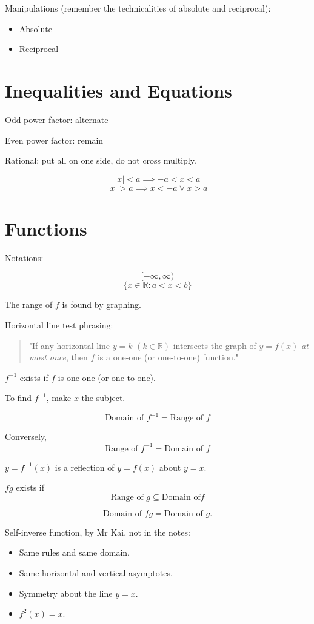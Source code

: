 \documentclass[a4paper]{article}
\begin{document}
Manipulations (remember the technicalities of absolute and reciprocal):
\begin{itemize}
	\item Absolute
	\item Reciprocal
\end{itemize}



\section{Inequalities and Equations}

Odd power factor: alternate

Even power factor: remain

Rational: put all on one side, do not cross multiply.

\[
|x| < a \implies -a < x < a
\]
\[
|x| > a \implies x < -a \lor x > a
\]

\section{Functions}

Notations:

\[
[-\infty, \infty)
\]
\[
\{ x \in \mathbb{R} : a < x < b \}
\]

The range of $f$ is found by graphing.

Horizontal line test phrasing:
\begin{quote}
	"If any horizontal line $y = k$ $(k \in \mathbb{R})$ intersects the graph of
	$y = f(x)$ \emph{at most once}, then $f$ is a one-one (or one-to-one) function."
\end{quote}

$f^{-1}$ exists if $f$ is one-one (or one-to-one).

To find $f^{-1}$, make $x$ the subject.

\[
\text{Domain of } f^{-1} = \text{Range of } f
\]

Conversely,
\[
\text{Range of } f^{-1} = \text{Domain of } f
\]
 
$ y = f^{-1}(x) $ is a reflection of $ y = f(x) $ about $ y = x $.

$fg$ exists if 
\[
\text{Range of } g \subseteq \text{Domain of} f
\]

\[
\text{Domain of } fg = \text{Domain of } g.
\]

Self-inverse function, by Mr Kai, not in the notes:
\begin{itemize}
	\item Same rules and same domain.
	\item Same horizontal and vertical asymptotes.
	\item Symmetry about the line $y = x$.
	\item $f^{2}(x) = x$.
\end{itemize}
\end{document}
